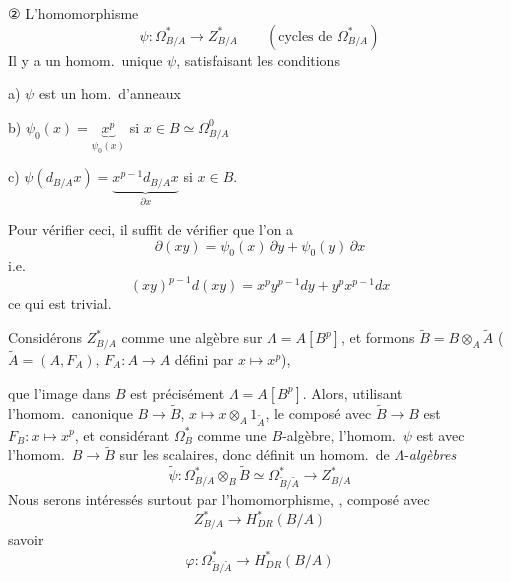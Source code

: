 \documentclass[11pt,a4paper]{article}
\begin{document}
② L'homomorphisme
\[
\psi : \Omega^{*}_{B/A} \to Z^{*}_{B/A} \qquad (\text{cycles de } \Omega^{*}_{B/A})
\]
Il y a un homom.\ unique $\psi$, satisfaisant les conditions

a) $\psi$ est un hom.\ d'anneaux

b) $\psi_{0}(x) = \underbrace{x^{p}}_{\psi_{0}(x)}$ si $x \in B \simeq \Omega^{0}_{B/A}$

c) $\psi(d_{B/A}x) = \underbrace{x^{p-1}d_{B/A}x}_{\partial x}$ si $x \in B$.

Pour vérifier ceci, il suffit de vérifier que l'on a
\[
\partial(xy) = \psi_{0}(x)\,\partial y + \psi_{0}(y)\,\partial x
\]
i.e.
\[
(xy)^{p-1}d(xy) = x^{p}y^{p-1}dy + y^{p}x^{p-1}dx
\]
ce qui est trivial.

Considérons $Z^{*}_{B/A}$ comme une algèbre sur $\Lambda = A[B^{p}]$, et formons
$\widetilde{B} = B \otimes_{A} \widetilde{A}$ ($\widetilde{A} = (A, F_{A})$, $F_{A} : A \to A$ défini par $x \mapsto x^{p}$),



  que l'image dans $B$ est précisément $\Lambda = A[B^{p}]$. Alors, utilisant l'homom.\ canonique $B \to \widetilde{B}$, $x \mapsto x \otimes_{A} 1_{\widetilde{A}}$,  le composé avec $\widetilde{B} \to B$ est $F_{B} : x \mapsto x^{p}$, et considérant $\Omega^{*}_{B}$ \ill{} comme une $B$-algèbre, l'homom.\ $\psi$ est 
avec l'homom.\ $B \to \widetilde{B}$ sur les scalaires, donc définit
un homom.\ de $\Lambda$-\emph{algèbres}
\[
\widetilde{\psi} : \Omega^{*}_{B/A} \otimes_{B} \widetilde{B} \simeq \Omega^{*}_{\widetilde{B}/\widetilde{A}} \to Z^{*}_{B/A}
\]
 Nous serons intéressés surtout par l'homomorphisme, \ill{}, composé avec
\[
Z^{*}_{B/A} \to H^{*}_{DR}(B/A)
\]
savoir
\[
\boxed{\varphi : \Omega^{*}_{\widetilde{B}/\widetilde{A}} \to H^{*}_{DR}(B/A)}
\]
\end{document}
